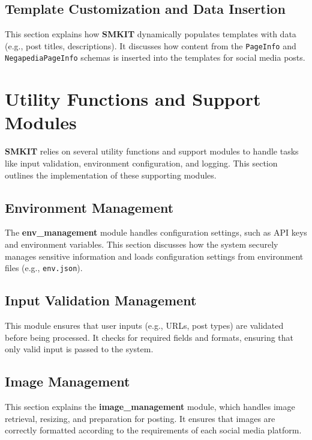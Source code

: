 \subsection{Template Customization and Data Insertion}
\label{subsec:template_customization_and_data_insertion}
This section explains how \textbf{SMKIT} dynamically populates templates with data (e.g., post titles, descriptions). It discusses how content from the \texttt{PageInfo} and \texttt{NegapediaPageInfo} schemas is inserted into the templates for social media posts.

\section{Utility Functions and Support Modules}
\label{sec:utility_functions_and_support_modules}
\textbf{SMKIT} relies on several utility functions and support modules to handle tasks like input validation, environment configuration, and logging. This section outlines the implementation of these supporting modules.

\subsection{Environment Management}
\label{subsec:Environment_management}
The \textbf{env\_management} module handles configuration settings, such as API keys and environment variables. This section discusses how the system securely manages sensitive information and loads configuration settings from environment files (e.g., \texttt{env.json}).

\subsection{Input Validation Management}
\label{subsec:input_validation_management}
This module ensures that user inputs (e.g., URLs, post types) are validated before being processed. It checks for required fields and formats, ensuring that only valid input is passed to the system.

\subsection{Image Management}
\label{subsec:image_management}
This section explains the \textbf{image\_management} module, which handles image retrieval, resizing, and preparation for posting. It ensures that images are correctly formatted according to the requirements of each social media platform.

